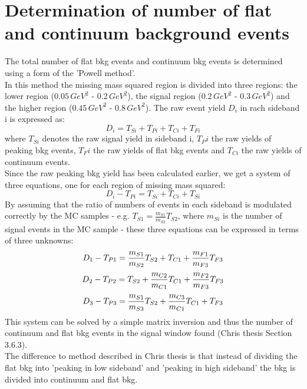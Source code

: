 \section{Determination of number of flat and continuum background events}
The total number of flat bkg events and continuum bkg events is determined using a form of the 'Powell method'.\\
In this method the missing mass squared region is divided into three regions: the lower region ($0.05\,GeV^2$ - $0.2\,GeV^2$), the signal region ($0.2\,GeV^2$ - $0.3\,GeV^2$) and the higher region ($0.45\,GeV^2$ - $0.8\,GeV^2$).
 The raw event yield $D_i$ in rach sideband i is expressed as:
\begin{equation}
D_i = T_{Si} + T_{Pi} + T_{Ci} + T_{Fi}
\end{equation}
where $T_{Si}$ denotes the raw signal yield in sideband i, $T_Pi$ the raw yields of peaking bkg events, $T_Fi$ the raw yields of flat bkg events and $T_{Ci}$ the raw yields of continuum events.\\
Since the raw peaking bkg yield has been calculated earlier, we get a system of three equations, one for each region of missing mass squared:
\begin{equation}
D_i -T_{Pi} = T_{Si} + T_{Ci} + T_{Si}
\end{equation}
By assuming that the ratio of numbers of events in each sideband is modulated correctly by the MC samples - e.g. $T_{S1} = \frac{m_{S1}}{m_{S2}} T_{S2}$, where $m_{Si}$ is the number of signal events in the MC sample - these three equations can be expressed in terms of three unknowns:
\begin{equation}
D_1 -T_{P1} =  \frac{m_{S1}}{m_{S2}} T_{S2}  + T_{C1} + \frac{m_{F1}}{m_{F3}} T_{F3}  \\
\end{equation}
\begin{equation}
D_2 -T_{P2} =   T_{S2}  + \frac{m_{C2}}{m_{C1}} T_{C1} + \frac{m_{F2}}{m_{F3}} T_{F3} \\
\end{equation}
\begin{equation}
D_3 -T_{P3} =  \frac{m_{S1}}{m_{S3}} T_{S2}  + \frac{m_{C3}}{m_{C1}} T_{C1} +  T_{F3} \\
\end{equation}
This system can be solved by a simple matrix inversion and thus the number of continuum and flat bkg events in the signal window found (Chris thesis Section 3.6.3). \\
The difference to method described in Chris thesis is that instead of dividing the flat bkg into 'peaking in low sideband' and 'peaking in high sideband' the bkg is divided into continuum and flat bkg.

